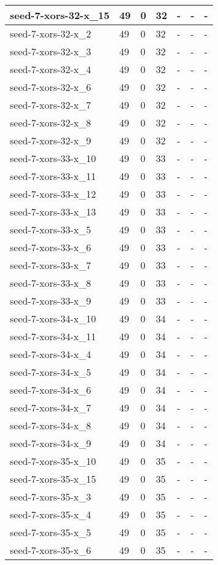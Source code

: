 \begin{scriptsize}
\begin{longtable}{|p{5cm}|l|l|l|l|l|l|}
seed-7-xors-32-x\_15&49&0&32&-&-&- \\ \hline 
seed-7-xors-32-x\_2&49&0&32&-&-&- \\ \hline 
seed-7-xors-32-x\_3&49&0&32&-&-&- \\ \hline 
seed-7-xors-32-x\_4&49&0&32&-&-&- \\ \hline 
seed-7-xors-32-x\_6&49&0&32&-&-&- \\ \hline 
seed-7-xors-32-x\_7&49&0&32&-&-&- \\ \hline 
seed-7-xors-32-x\_8&49&0&32&-&-&- \\ \hline 
seed-7-xors-32-x\_9&49&0&32&-&-&- \\ \hline 
seed-7-xors-33-x\_10&49&0&33&-&-&- \\ \hline 
seed-7-xors-33-x\_11&49&0&33&-&-&- \\ \hline 
seed-7-xors-33-x\_12&49&0&33&-&-&- \\ \hline 
seed-7-xors-33-x\_13&49&0&33&-&-&- \\ \hline 
seed-7-xors-33-x\_5&49&0&33&-&-&- \\ \hline 
seed-7-xors-33-x\_6&49&0&33&-&-&- \\ \hline 
seed-7-xors-33-x\_7&49&0&33&-&-&- \\ \hline 
seed-7-xors-33-x\_8&49&0&33&-&-&- \\ \hline 
seed-7-xors-33-x\_9&49&0&33&-&-&- \\ \hline 
seed-7-xors-34-x\_10&49&0&34&-&-&- \\ \hline 
seed-7-xors-34-x\_11&49&0&34&-&-&- \\ \hline 
seed-7-xors-34-x\_4&49&0&34&-&-&- \\ \hline 
seed-7-xors-34-x\_5&49&0&34&-&-&- \\ \hline 
seed-7-xors-34-x\_6&49&0&34&-&-&- \\ \hline 
seed-7-xors-34-x\_7&49&0&34&-&-&- \\ \hline 
seed-7-xors-34-x\_8&49&0&34&-&-&- \\ \hline 
seed-7-xors-34-x\_9&49&0&34&-&-&- \\ \hline 
seed-7-xors-35-x\_10&49&0&35&-&-&- \\ \hline 
seed-7-xors-35-x\_15&49&0&35&-&-&- \\ \hline 
seed-7-xors-35-x\_3&49&0&35&-&-&- \\ \hline 
seed-7-xors-35-x\_4&49&0&35&-&-&- \\ \hline 
seed-7-xors-35-x\_5&49&0&35&-&-&- \\ \hline 
seed-7-xors-35-x\_6&49&0&35&-&-&- \\ \hline 

\end{longtable}
\end{scriptsize}
